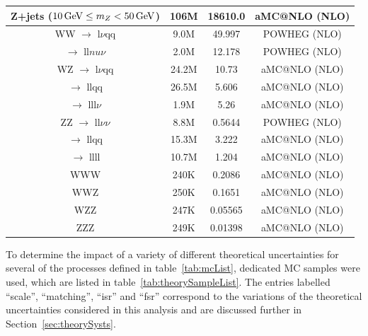 \begin{table}[htbp]
{\begin{tabular}{cccc}
   Z+jets ($10 \,\text{Ge\hspace{-.08em}V} \leq m_{Z} < 50\,\text{Ge\hspace{-.08em}V}$) & 106M & 18610.0 & aMC@NLO (NLO) \\
   \hline
   WW $\rightarrow$ l$\nu$qq & 9.0M & 49.997  & POWHEG (NLO) \\
      $\rightarrow$ ll$nu\nu$ & 2.0M & 12.178 & POWHEG (NLO) \\
   \hline
   WZ $\rightarrow$ l$\nu$qq & 24.2M & 10.73 & aMC@NLO (NLO) \\
      $\rightarrow$ llqq & 26.5M & 5.606 & aMC@NLO (NLO) \\
      $\rightarrow$ lll$\nu$ & 1.9M & 5.26 & aMC@NLO (NLO) \\
   \hline
   ZZ $\rightarrow$ ll$\nu\nu$ & 8.8M & 0.5644 & POWHEG (NLO) \\
      $\rightarrow$ llqq & 15.3M & 3.222 & aMC@NLO (NLO) \\
      $\rightarrow$ llll & 10.7M & 1.204 & aMC@NLO (NLO) \\
   \hline
   WWW & 240K & 0.2086 & aMC@NLO (NLO) \\
   \hline
   WWZ & 250K & 0.1651 & aMC@NLO (NLO) \\
   \hline
   WZZ & 247K & 0.05565 & aMC@NLO (NLO) \\
   \hline
   ZZZ & 249K & 0.01398 & aMC@NLO (NLO) \\
   \hline
   
 \end{tabular}}
\end{table}

To determine the impact of a variety of different theoretical uncertainties for several of the processes defined in table~\ref{tab:mcList}, dedicated MC samples were used, which are listed in table~\ref{tab:theorySampleList}.
The entries labelled ``scale'', ``matching'', ``isr'' and ``fsr'' correspond to the variations of the theoretical uncertainties considered in this analysis and are discussed further in Section~\ref{sec:theorySysts}.

